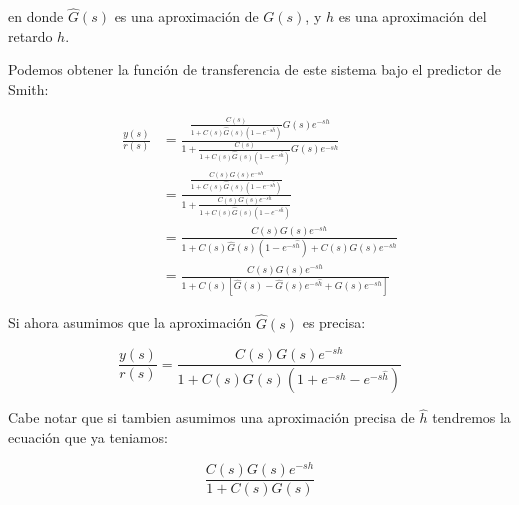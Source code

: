         en donde $\hat{G}(s)$ es una aproximación de $G(s)$, y $\hat{h}$ es una aproximación del retardo $h$.

        Podemos obtener la función de transferencia de este sistema bajo el predictor de Smith:

        \begin{align*}
            \frac{y(s)}{r(s)} &= \frac{\frac{C(s)}{1 + C(s)\hat{G}(s)\left( 1 - e^{-s\hat{h}} \right)}G(s)e^{-sh}}{1 + \frac{C(s)}{1 + C(s)\hat{G}(s)\left( 1 - e^{-s\hat{h}} \right)}G(s)e^{-sh}} \\
            &= \frac{\frac{C(s)G(s)e^{-sh}}{1 + C(s)\hat{G}(s)\left( 1 - e^{-s\hat{h}} \right)}}{1 + \frac{C(s)G(s)e^{-sh}}{1 + C(s)\hat{G}(s)\left( 1 - e^{-s\hat{h}} \right)}} \\
            &= \frac{C(s)G(s)e^{-sh}}{1 + C(s)\hat{G}(s)\left( 1 - e^{-s\hat{h}} \right) + C(s)G(s)e^{-sh}} \\
            &= \frac{C(s)G(s)e^{-sh}}{1 + C(s) \left[ \hat{G}(s) - \hat{G}(s)e^{-s\hat{h}} + G(s)e^{-sh} \right]}
        \end{align*}

        Si ahora asumimos que la aproximación $\hat{G}(s)$ es precisa:

        \begin{equation}
            \frac{y(s)}{r(s)} = \frac{C(s)G(s)e^{-sh}}{1 + C(s) G(s) \left( 1 + e^{-sh} - e^{-s\hat{h}} \right)}
        \end{equation}

        Cabe notar que si tambien asumimos una aproximación precisa de $\hat{h}$ tendremos la ecuación que ya teniamos:

        \begin{equation}
            \frac{C(s)G(s)e^{-sh}}{1 + C(s)G(s)}
        \end{equation}

    
    


